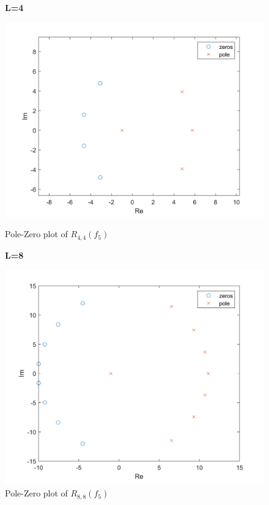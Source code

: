 \documentclass[10pt]{article}
\begin{document}
\begin{figure}[H]
    \begin{minipage}[b]{0.47\linewidth}
            \centering
            \textbf{L=4}\par
            \includegraphics[width=\textwidth]{Files/q5,f5,4.png}
            \caption{Pole-Zero plot of $R_{4,4}(f_5)$}
        \end{minipage}
        \hfill
            \begin{minipage}[b]{0.47\linewidth}
            \centering
    \textbf{L=8}\par
    \includegraphics[width=\textwidth]{Files/q5,f5,8.png}
    \caption{Pole-Zero plot of $R_{8,8}(f_5)$}
        \end{minipage}
\end{figure}
\end{document}
